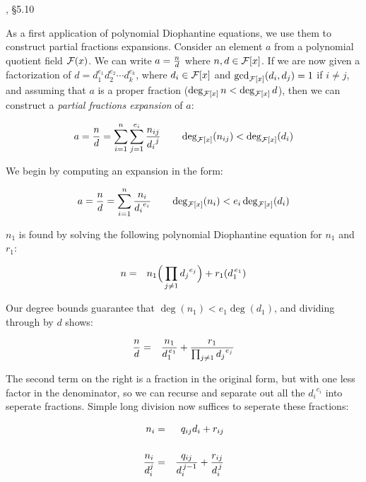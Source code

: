 \vfill\eject

, \S5.10

As a first application of polynomial Diophantine equations, we use
them to construct partial fractions expansions.  Consider an element
$a$ from a polynomial quotient field ${\cal F}(x)$.  We can write
$a={n\over d}$ where $n,d\in{\cal F}[x]$.  If we are now given a
factorization of $d=d_1^{e_1} d_2^{e_2} \cdots d_k^{e_k}$, where
$d_i\in {\cal F}[x]$ and $\gcd_{{\cal F}[x]}(d_i,d_j)=1$ if $i\ne j$,
and assuming that $a$ is a proper fraction
($\deg_{{\cal F}[x]}n < \deg_{{\cal F}[x]}d$),
then we can construct a {\it partial fractions expansion} of $a$:

\begin{displaymath}
a={n\over d}=\sum_{i=1}^{n}\sum_{j=1}^{e_i} {n_{ij}\over {d_i}^j}
\qquad \deg_{{\cal F}[x]}(n_{ij}) < \deg_{{\cal F}[x]}(d_i)
\end{displaymath}

We begin by computing an expansion in the form:

\begin{displaymath}
a={n\over d}=\sum_{i=1}^{n} {n_i\over {d_i}^{e_i}}
\qquad \deg_{{\cal F}[x]}(n_i) < e_i\deg_{{\cal F}[x]}(d_i)
\end{displaymath}

$n_1$ is found by solving the following polynomial Diophantine
equation for $n_1$ and $r_1$:

\begin{eqnarray*}
n &=& n_1 \Big( \prod_{j\ne 1} {d_j}^{e_j} \Big) + r_1 (d_1^{\,e_1}) \cr
\end{eqnarray*}

Our degree bounds guarantee that
$\deg(n_1) < e_1\deg(d_1)$, and dividing through by $d$ shows:

\begin{eqnarray*}
{n\over d} &=& {{n_1}\over{d_1^{\,e_1}}} + {r_1\over{\prod_{j\ne 1} {d_j}^{e_j}}} \cr
\end{eqnarray*}

The second term on the right is a fraction in the original form,
but with one less factor in the denominator, so we can recurse
and separate out all the ${d_i}^{e_i}$ into seperate fractions.
Simple long division now suffices to seperate these fractions:

\begin{eqnarray*}
n_i &=& q_{ij} d_i + r_{ij} \cr\cr
{{n_i}\over{d_i^j}} &=& {{q_{ij}}\over{d_i^{\,j-1}}} + {r_{ij}\over{d_i^{\,j}}} \cr
\end{eqnarray*}

